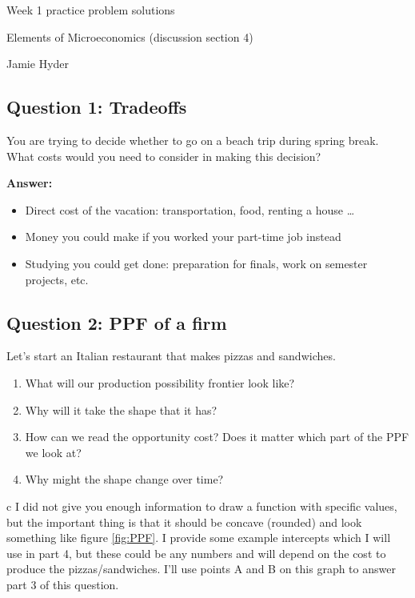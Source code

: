 \documentclass[12pt]{article}
\begin{document}
\begin{center}
\Large Week 1 practice problem solutions

\medskip

\normalsize Elements of Microeconomics (discussion section 4)

\medskip

\small Jamie Hyder
\end{center}

\medskip

\subsection*{Question 1: Tradeoffs}
You are trying to decide whether to go on a beach trip during spring break. What costs would you need to consider in making this decision?

\medskip

\textbf{Answer:}

\begin{itemize}
    \item Direct cost of the vacation: transportation, food, renting a house \dots
    \item Money you could make if you worked your part-time job instead
    \item Studying you could get done: preparation for finals, work on semester projects, etc.
\end{itemize}

\subsection*{Question 2: PPF of a firm}
Let's start an Italian restaurant that makes pizzas and sandwiches.
\begin{enumerate}
    \item What will our production possibility frontier look like?
    \item Why will it take the shape that it has?
    \item How can we read the opportunity cost? Does it matter which part of the PPF we look at?
    \item Why might the shape change over time?
\end{enumerate}

c I did not give you enough information to draw a function with specific values, but the important thing is that it should be concave (rounded) and look something like figure \ref{fig:PPF}. I provide some example intercepts which I will use in part 4, but these could be any numbers and will depend on the cost to produce the pizzas/sandwiches. I'll use points A and B on this graph to answer part 3 of this question.
\end{document}
